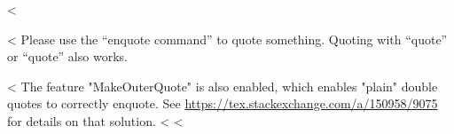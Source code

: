 <%

<%
Please use the \enquote{enquote command} to quote something.
Quoting with "`quote"' or ``quote'' also works.

<%
The feature "MakeOuterQuote" is also enabled, which enables "plain" double quotes to correctly enquote.
See \url{https://tex.stackexchange.com/a/150958/9075} for details on that solution.
<%
<%
